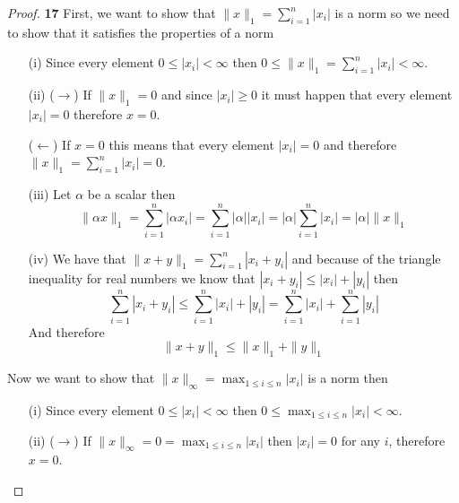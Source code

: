 \documentclass[11pt]{article}
\theoremstyle{definition}
\begin{document}
	\begin{proof}{\textbf{17}}
        First, we want to show that $\|x\|_1 = \sum_{i=1}^n |x_i|$ is a norm so we
        need to show that it satisfies the properties of a norm
        \begin{itemize}
            \item [(i)] Since every element $0 \leq |x_i| < \infty$ then
            $0 \leq \|x\|_1 = \sum_{i=1}^n |x_i| < \infty$.
            \item [(ii)] ($\rightarrow$) If $\|x\|_1 = 0$ and since $|x_i| \geq 0$
            it must happen that every element $|x_i| = 0$ therefore $x = 0$.
            
            ($\leftarrow$) If $x = 0$ this means that every element $|x_i| = 0$ and
            therefore $\|x\|_1 = \sum_{i=1}^n |x_i| = 0$.
            \item [(iii)] Let $\alpha$ be a scalar then
            $$\|\alpha x\|_1 = \sum_{i=1}^n |\alpha x_i| = \sum_{i=1}^n |\alpha||x_i|
            = |\alpha|\sum_{i=1}^n|x_i| = |\alpha|\|x\|_1$$
            \item [(iv)] We have that $\|x+y\|_1 = \sum_{i=1}^n|x_i + y_i|$ and
            because of the triangle inequality for real numbers we know
            that $|x_i + y_i| \leq |x_i| + |y_i|$ then
            $$\sum_{i=1}^n|x_i + y_i| \leq \sum_{i=1}^n|x_i| + |y_i| = \sum_{i=1}^n|x_i| + \sum_{i=1}^n|y_i|$$
            And therefore
            $$\|x+y\|_1 \leq \|x\|_1 + \|y\|_1$$
        \end{itemize}
        Now we want to show that $\|x\|_\infty = \max_{1\leq i\leq n} |x_i|$ is a norm
        then
        \begin{itemize}
            \item [(i)] Since every element $0 \leq |x_i| < \infty$ then
            $0 \leq \max_{1\leq i\leq n} |x_i| < \infty$.
            \item [(ii)] ($\rightarrow$) If $\|x\|_\infty = 0 = \max_{1\leq i\leq n} |x_i|$
            then $|x_i| = 0$ for any $i$, therefore $x = 0$.


\end{itemize}
\end{proof}
\end{document}
